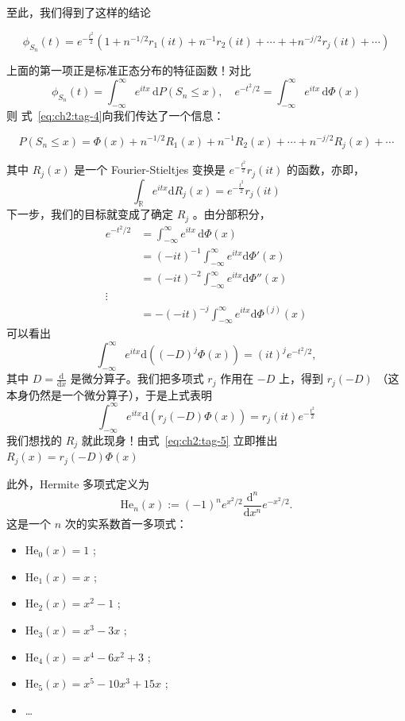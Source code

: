 至此，我们得到了这样的结论

\begin{equation}
\label{eq:ch2:tag-4}
\phi_{S_n}(t)=e^{-\frac{t^2}2}\left(1+n^{-1/2}r_1(it)+n^{-1}r_2(it)+\cdots++n^{-j/2}r_j(it)+\cdots\right)
\end{equation}

上面的第一项正是标准正态分布的特征函数！对比 \[ \phi_{S_n}(t) = \int_{-\infty}^\infty e^{itx}\,\mathrm dP(S_n \leq x), \quad e^{-t^2/2} = \int_{-\infty}^\infty e^{itx}\,\mathrm d\Phi(x) \]则 式~\eqref{eq:ch2:tag-4}向我们传达了一个信息：

\begin{equation}
\label{eq:ch2:tag-5}
P(S_n\le x)=\Phi(x)+n^{-1/2}R_1(x)+n^{-1}R_2(x)+\cdots+n^{-j/2 }R_j(x)+\cdots
\end{equation}

其中 $R_j(x)$ 是一个 Fourier-Stieltjes 变换是 $e^{-\frac{t^2}2}r_j(it)$ 的函数，亦即，\[\int_{\mathbb R}e^{itx}\mathrm{d}R_j(x)=e^{-\frac{t^2}2}r_j(it)\]
下一步，我们的目标就变成了确定 $R_j$ 。由分部积分，\[\begin{aligned}  e^{-t^2/2} &= \int_{-\infty}^\infty  e^{itx}\,\mathrm d\Phi(x)\\ & =(-it)^{-1}\int_{-\infty}^{\infty}e^{itx}\mathrm d\Phi'(x) \\   & =(-it)^{-2}\int_{-\infty}^{\infty}e^{itx}\mathrm d\Phi''(x) \\   \vdots\\   & =-(-it)^{-j}\int_{-\infty}^{\infty}e^{itx}\mathrm d\Phi^{(j)}(x) \end{aligned}\]
可以看出
\[
\int_{-\infty}^\infty e^{itx}\mathrm{d}((-D)^j\Phi(x))
=(it)^je^{-t^2/2},
\]
其中 $D=\frac{\mathrm d}{\mathrm dx}$ 是微分算子。我们把多项式 $r_j$ 作用在 $-D$ 上，得到 $r_j(-D)$ （这本身仍然是一个微分算子），于是上式表明\[\int_{-\infty}^\infty e^{itx}\mathrm{d}(r_j(-D)\Phi(x))=r_j(it)e^{-\frac{t^2}2}\]
我们想找的 $R_j$ 就此现身！由式~\eqref{eq:ch2:tag-5} 立即推出 $R_j(x)=r_j\left(-D\right)\Phi(x)$

此外，Hermite 多项式定义为
\[
\mathrm{He}_n(x):=(-1)^ne^{x^2/2}\frac{\mathrm{d}^n}{\mathrm{d}x^n}e^{-x^2/2}.
\]
这是一个 $n$ 次的实系数首一多项式：

\begin{itemize}
\tightlist
\item
  $\mathrm{He}_0(x)=1$ ;
\item
  $\mathrm{He}_1(x)=x$ ;
\item
  $\mathrm{He}_2(x)=x^2-1$ ;
\item
  $\mathrm{He}_3(x)=x^3-3x$ ;
\item
  $\mathrm{He}_4(x)=x^4-6x^2+3$ ;
\item
  $\mathrm{He}_5(x)=x^5-10x^3+15x$ ;
\item
  \ldots{}
\end{itemize}

